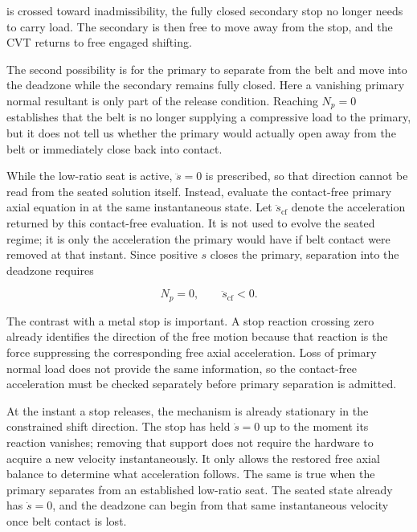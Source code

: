 \documentclass[11pt]{report}
\numberwithin{equation}{section}
\begin{document}
is crossed toward inadmissibility, the fully closed secondary stop no longer needs to
carry load. The secondary is then free to move away from the stop, and the CVT returns
to free engaged shifting.

The second possibility is for the primary to separate from the belt and move into the
deadzone while the secondary remains fully closed. Here a vanishing primary normal
resultant is only part of the release condition. Reaching \(N_p=0\) establishes that the
belt is no longer supplying a compressive load to the primary, but it does not tell us
whether the primary would actually open away from the belt or immediately close back
into contact.

While the low-ratio seat is active, \(\ddot s=0\) is prescribed, so that direction
cannot be read from the seated solution itself. Instead, evaluate the contact-free
primary axial equation in  at the same
instantaneous state. Let \(\ddot s_{\mathrm{cf}}\) denote the acceleration returned by
this contact-free evaluation. It is not used to evolve the seated regime; it is only the
acceleration the primary would have if belt contact were removed at that instant. Since
positive \(s\) closes the primary, separation into the deadzone requires

\begin{equation}
    N_p=0,
    \qquad
    \ddot s_{\mathrm{cf}}<0.
    \label{eq:primary_separation_conditions}
\end{equation}

The contrast with a metal stop is important. A stop reaction crossing zero already
identifies the direction of the free motion because that reaction is the force
suppressing the corresponding free axial acceleration. Loss of primary normal load does
not provide the same information, so the contact-free acceleration must be checked
separately before primary separation is admitted.

At the instant a stop releases, the mechanism is already stationary in the constrained
shift direction. The stop has held \(\dot s=0\) up to the moment its reaction vanishes;
removing that support does not require the hardware to acquire a new velocity
instantaneously. It only allows the restored free axial balance to determine what
acceleration follows. The same is true when the primary separates from an established
low-ratio seat. The seated state already has \(\dot s=0\), and the deadzone can begin
from that same instantaneous velocity once belt contact is lost.
\end{document}
